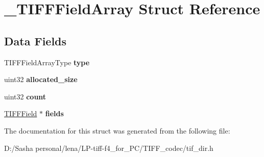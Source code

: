 \hypertarget{struct___t_i_f_f_field_array}{}\section{\+\_\+\+T\+I\+F\+F\+Field\+Array Struct Reference}
\label{struct___t_i_f_f_field_array}
\subsection*{Data Fields}
\begin{DoxyCompactItemize}
\item 
\hypertarget{struct___t_i_f_f_field_array_a60d92984190671fb5434fcb9c296a9f3}{}T\+I\+F\+F\+Field\+Array\+Type {\bfseries type}\label{struct___t_i_f_f_field_array_a60d92984190671fb5434fcb9c296a9f3}

\item 
\hypertarget{struct___t_i_f_f_field_array_a8805642a8cc7fbed99b2b88db0c41f6e}{}uint32 {\bfseries allocated\+\_\+size}\label{struct___t_i_f_f_field_array_a8805642a8cc7fbed99b2b88db0c41f6e}

\item 
\hypertarget{struct___t_i_f_f_field_array_ae19373f8138c83a1f557f935099b3063}{}uint32 {\bfseries count}\label{struct___t_i_f_f_field_array_ae19373f8138c83a1f557f935099b3063}

\item 
\hypertarget{struct___t_i_f_f_field_array_a72b9d88a181e8152575625c1000b3636}{}\hyperlink{struct___t_i_f_f_field}{T\+I\+F\+F\+Field} $\ast$ {\bfseries fields}\label{struct___t_i_f_f_field_array_a72b9d88a181e8152575625c1000b3636}

\end{DoxyCompactItemize}


The documentation for this struct was generated from the following file\+:\begin{DoxyCompactItemize}
\item 
D\+:/\+Sasha personal/lena/\+L\+P-\/tiff-\/f4\+\_\+for\+\_\+\+P\+C/\+T\+I\+F\+F\+\_\+codec/tif\+\_\+dir.\+h\end{DoxyCompactItemize}
